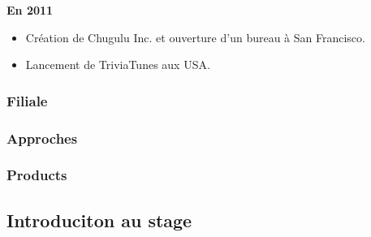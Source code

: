 \textbf{En 2011}

\begin{itemize}
	\item Création de Chugulu Inc. et ouverture d’un bureau à San Francisco.
	\item Lancement de TriviaTunes aux USA.
\end{itemize}


\subsubsection{Filiale} %


\subsubsection{Approches} %


\subsubsection{Products} %


\subsection{Introduciton au stage} %


